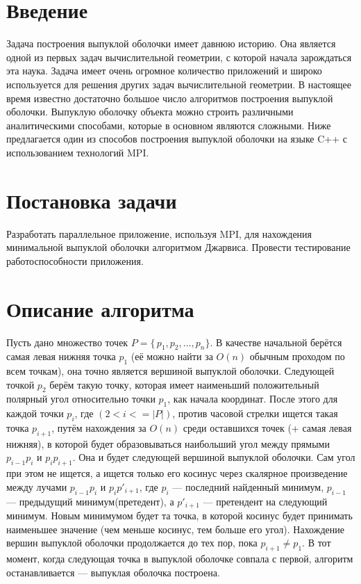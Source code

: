 \documentclass{report}
\begin{document}
\setcounter{page}{2}

\tableofcontents
\newpage

\section*{Введение}
Задача построения выпуклой оболочки имеет давнюю историю. Она является одной из первых задач вычислительной геометрии, с которой начала зарождаться эта наука.  Задача имеет очень огромное количество приложений и широко используется для решения других задач вычислительной геометрии. В настоящее время известно достаточно большое число алгоритмов построения выпуклой оболочки. Выпуклую оболочку объекта можно строить различными аналитическими способами, которые в основном являются сложными. Ниже предлагается один из способов построения выпуклой оболочки на языке C++ с использованием технологий MPI.
\newpage

\section*{Постановка задачи}
Разработать параллельное приложение, используя MPI, для нахождения минимальной выпуклой оболочки алгоритмом Джарвиса.
Провести тестирование работоспособности приложения.
\newpage

\section*{Описание алгоритма}
Пусть дано множество точек $P=\{\,p_1, p_2, ..., p_n\}$. В качестве начальной берётся самая левая нижняя точка $p_1$ (её можно найти за $O(n)$ обычным проходом по всем точкам), она точно является вершиной выпуклой оболочки. Следующей точкой  $p_2$ берём такую точку, которая имеет наименьший положительный полярный угол относительно точки $p_1$, как начала координат. После этого для каждой точки $p_i$, где $(2<i<=|P|)$, против часовой стрелки ищется такая точка $p_{i+1}$, путём нахождения за $O(n)$ среди оставшихся точек (+ самая левая нижняя), в которой будет образовываться наибольший угол между прямыми $p_{i-1} p_i$ и $p_{i}p_{i+1}$. Она и будет следующей вершиной выпуклой оболочки. Сам угол при этом не ищется, а ищется только его косинус через скалярное произведение между лучами  $p_{i-1}p_{i}$ и $p_{i}p'_{i+1}$, где  $p_{i}$ — последний найденный минимум,  $p_{i-1}$ — предыдущий минимум(претедент), а $p'_{i+1}$ — претендент на следующий минимум. Новым минимумом будет та точка, в которой косинус будет принимать наименьшее значение (чем меньше косинус, тем больше его угол). Нахождение вершин выпуклой оболочки продолжается до тех пор, пока $p_{i+1}\neq p_{1}$. В тот момент, когда следующая точка в выпуклой оболочке совпала с первой, алгоритм останавливается — выпуклая оболочка построена.
\newpage
\end{document}
